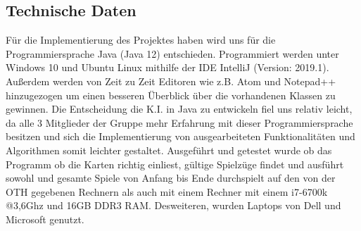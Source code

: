 \documentclass[12pt,a4paper,bibliography=totocnumbered,listof=totocnumbered,ngerman]{scrartcl}
\begin{document}
\subsection{Technische Daten}
Für die Implementierung des Projektes haben wird uns für die Programmiersprache Java (Java 12) entschieden.
Programmiert werden unter Windows 10\label{Windows 10} und Ubuntu Linux\label{Ubuntu} mithilfe der IDE IntelliJ (Version: 2019.1)\label{IntelliJ}.
Außerdem werden von Zeit zu Zeit Editoren wie z.B. Atom\label{Atom} und Notepad++\label{Notepad} hinzugezogen um  einen besseren Überblick über die vorhandenen Klassen zu gewinnen.
Die Entscheidung die K.I. in Java zu entwickeln fiel uns relativ leicht, da alle 3 Mitglieder der Gruppe mehr Erfahrung mit dieser Programmiersprache besitzen und sich die Implementierung von ausgearbeiteten Funktionalitäten und Algorithmen somit leichter gestaltet.
Ausgeführt und getestet wurde ob das Programm ob die Karten richtig einliest, gültige Spielzüge findet und ausführt sowohl und gesamte Spiele von Anfang bis Ende durchspielt auf den von der OTH gegebenen Rechnern als auch mit einem Rechner mit einem i7-6700k @3,6Ghz und 16GB DDR3 RAM. Desweiteren, wurden Laptops von Dell und Microsoft genutzt.
\end{document}

